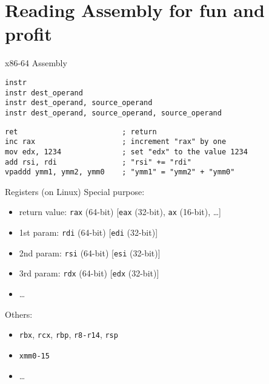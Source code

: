 \section{Reading Assembly for fun and profit}

\begin{frame}[fragile]{x86-64 Assembly}
    \begin{lstlisting}[language={}]
instr
instr dest_operand
instr dest_operand, source_operand
instr dest_operand, source_operand, source_operand
    \end{lstlisting}

    \begin{lstlisting}[language={}]
ret                        ; return
inc rax                    ; increment "rax" by one
mov edx, 1234              ; set "edx" to the value 1234
add rsi, rdi               ; "rsi" += "rdi"
vpaddd ymm1, ymm2, ymm0    ; "ymm1" = "ymm2" + "ymm0"
    \end{lstlisting}
\end{frame}

\begin{frame}{Registers (on Linux)}
    Special purpose:
    \begin{itemize}
        \item return value: \texttt{rax} (64-bit) [\texttt{eax} (32-bit), \texttt{ax} (16-bit), \ldots]
        \item 1st param: \texttt{rdi} (64-bit) [\texttt{edi} (32-bit)]
        \item 2nd param: \texttt{rsi} (64-bit) [\texttt{esi} (32-bit)]
        \item 3rd param: \texttt{rdx} (64-bit) [\texttt{edx} (32-bit)]
        \item \ldots
    \end{itemize}

    Others:
    \begin{itemize}
        \item \texttt{rbx}, \texttt{rcx}, \texttt{rbp}, \texttt{r8-r14}, \texttt{rsp}
        \item \texttt{xmm0-15}
        \item \ldots
    \end{itemize}
\end{frame}

